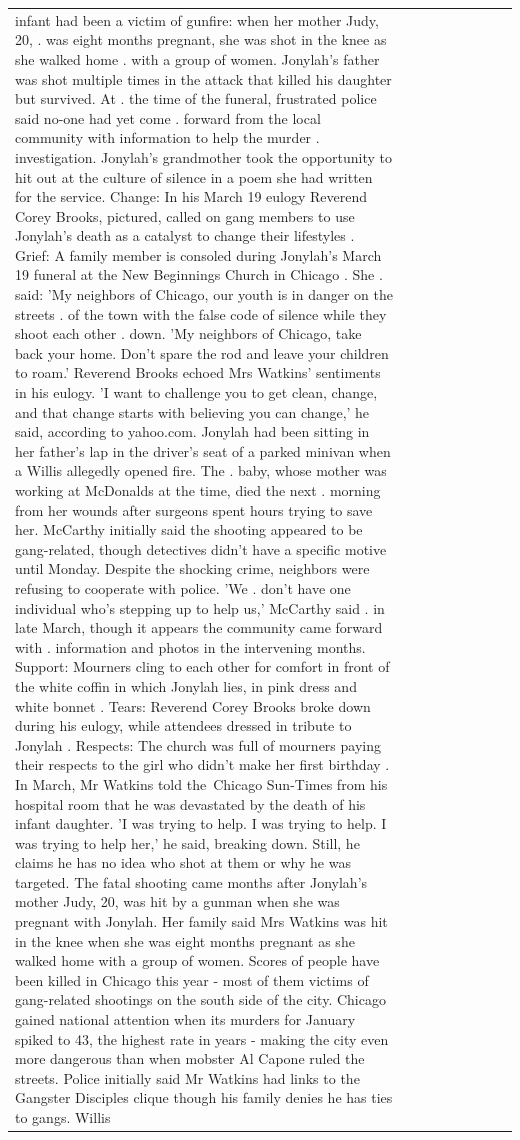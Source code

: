 \begin{table}[H]
\begin{tabular}{lllrlllll}
infant had been a victim of gunfire: when her mother Judy, 20, . was eight months pregnant, she was shot in the knee as she walked home . with a group of women. Jonylah's father was shot multiple times in the attack that killed his daughter but survived. At . the time of the funeral, frustrated police said no-one had yet come . forward from the local community with information to help the murder . investigation. Jonylah's grandmother took the opportunity to hit out at the culture of silence in a poem she had written for the service. Change: In his March 19 eulogy Reverend Corey Brooks, pictured, called on gang members to use Jonylah's death as a catalyst to change their lifestyles . Grief: A family member is consoled during Jonylah's March 19 funeral at the New Beginnings Church in Chicago . She . said: 'My neighbors of Chicago, our youth is in danger on the streets . of the town with the false code of silence while they shoot each other . down. 'My neighbors of Chicago, take back your home. Don't spare the rod and leave your children to roam.' Reverend Brooks echoed Mrs Watkins' sentiments in his eulogy. 'I want to challenge you to get clean, change, and that change starts with believing you can change,' he said, according to yahoo.com. Jonylah had been sitting in her father's lap in the driver's seat of a parked minivan when a Willis allegedly opened fire. The . baby, whose mother was working at McDonalds at the time, died the next . morning from her wounds after surgeons spent hours trying to save her. McCarthy initially said the shooting appeared to be gang-related, though detectives didn't have a specific motive until Monday. Despite the shocking crime, neighbors were refusing to cooperate with police. 'We . don't have one individual who's stepping up to help us,' McCarthy said . in late March, though it appears the community came forward with . information and photos in the intervening months. Support: Mourners cling to each other for comfort in front of the white coffin in which Jonylah lies, in pink dress and white bonnet . Tears: Reverend Corey Brooks broke down during his eulogy, while attendees dressed in tribute to Jonylah . Respects: The church was full of mourners paying their respects to the girl who didn't make her first birthday . In March, Mr Watkins told the Chicago Sun-Times from his hospital room that he was devastated by the death of his infant daughter. 'I was trying to help. I was trying to help. I was trying to help her,' he said, breaking down. Still, he claims he has no idea who shot at them or why he was targeted. The fatal shooting came months after Jonylah's mother Judy, 20, was hit by a gunman when she was pregnant with Jonylah. Her family said Mrs Watkins was hit in the knee when she was eight months pregnant as she walked home with a group of women. Scores of people have been killed in Chicago this year - most of them victims of gang-related shootings on the south side of the city. Chicago gained national attention when its murders for January spiked to 43, the highest rate in years - making the city even more dangerous than when mobster Al Capone ruled the streets. Police initially said Mr Watkins had links to the Gangster Disciples clique though his family denies he has ties to gangs. Willis 
\end{tabular}
\end{table}
